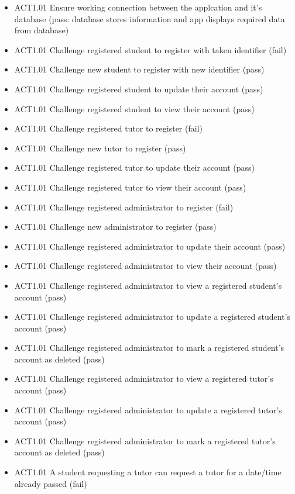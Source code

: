 \documentclass[12pt]{article}
\begin{document}
\begin{itemize}
\item ACT1.01	Ensure working connection between the applcation and it's database (pass: database stores information and app displays required data from database)
\item ACT1.01	Challenge registered student to register with taken identifier (fail)
\item ACT1.01	Challenge new student to register with new identifier (pass)
\item ACT1.01	Challenge registered student to update their account (pass)
\item ACT1.01	Challenge registered student to view their account (pass)
\item ACT1.01	Challenge registered tutor to register (fail)
\item ACT1.01	Challenge new tutor to register (pass)
\item ACT1.01	Challenge registered tutor to update their account (pass)
\item ACT1.01	Challenge registered tutor to view their account (pass)
\item ACT1.01	Challenge registered administrator to register (fail)
\item ACT1.01	Challenge new administrator to register (pass)
\item ACT1.01	Challenge registered administrator to update their account (pass)
\item ACT1.01	Challenge registered administrator to view their account (pass)
\item ACT1.01	Challenge registered administrator to view a registered student's account (pass)
\item ACT1.01	Challenge registered administrator to update a registered student's account (pass)
\item ACT1.01	Challenge registered administrator to mark a registered student's account as deleted (pass)
\item ACT1.01	Challenge registered administrator to view a registered tutor's account (pass)
\item ACT1.01	Challenge registered administrator to update a registered tutor's account (pass)
\item ACT1.01	Challenge registered administrator to mark a registered tutor's account as deleted (pass)
\item ACT1.01	A student requesting a tutor can request a tutor for a date/time already passed  (fail)	

\end{itemize}
\end{document}
